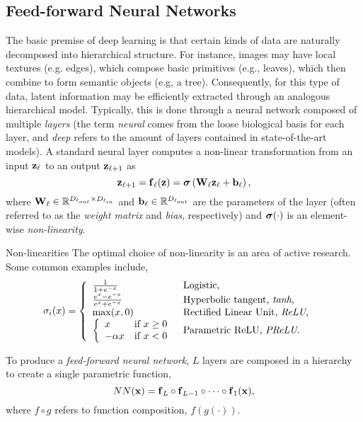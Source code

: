 \subsection{Feed-forward Neural Networks} 
The basic premise of deep learning is that certain kinds of data are naturally decomposed into hierarchical structure. For instance, images may have local textures (e.g. edges), which compose basic primitives (e.g., leaves), which then combine to form semantic objects (e.g, a tree). Consequently, for this type of data, latent information may be efficiently extracted through an analogous hierarchical model.  Typically, this is done through a neural network composed of multiple \textit{layers} (the term \textit{neural} comes from the loose biological basis for each layer, and \textit{deep} refers to the amount of layers contained in state-of-the-art models). A standard neural layer computes a non-linear transformation from an input $\boldsymbol{\mathbf{z}}_\ell$ to an output $\boldsymbol{\mathbf{z}}_{\ell+1}$ as  
\begin{equation}
\boldsymbol{\mathbf{z}}_{\ell+1} = \boldsymbol{\mathbf{f}}_\ell(\boldsymbol{\mathbf{z}}) = \boldsymbol{\mathbf{\sigma}}\left(\boldsymbol{\mathbf{W}}_\ell\boldsymbol{\mathbf{z}}_\ell + \boldsymbol{\mathbf{b}}_\ell\right),
\end{equation}
where $\boldsymbol{\mathbf{W}}_\ell \in \mathbb{R}^{D_{\ell_{out}} \times D_{\ell_{in}}}$ and $\boldsymbol{\mathbf{b}}_\ell \in \mathbb{R}^{D_{\ell_{out}}}$ are the parameters of the layer (often referred to as the \textit{weight matrix} and \textit{bias}, respectively) and $\boldsymbol{\mathbf{\sigma}}(\cdot)$ is an element-wise \textit{non-linearity}.

\begin{remark}{Non-linearities}
	The optimal choice of non-linearity is an area of active research. Some common examples include,
	\begin{align}
\sigma_i(x) &= \left\{  	\begin{array}{ll}
		 \frac{1}{1+e^{-x}}   & \mbox{Logistic,} \\
		 \frac{e^x - e^{-x}}{e^x + e^{-x}}  & \mbox{Hyperbolic tangent, \textit{tanh},} \\
		 \max(x, 0)  & \mbox{Rectified Linear Unit, \textit{ReLU},} \\
		\left\{  	\begin{array}{ll}  x & \mbox{if} ~x \geq 0 \\
										-\alpha x & \mbox{if} ~ x < 0 \end{array}
		\right.   & \mbox{Parametric ReLU, \textit{PReLU}.} \end{array}\right.
\end{align}
\end{remark}
To produce a \textit{feed-forward neural network}, $L$ layers are composed in a hierarchy to create a single parametric function,
\begin{equation}
 NN(\boldsymbol{\mathbf{x}}) = \boldsymbol{\mathbf{f}}_L \circ \boldsymbol{\mathbf{f}}_{L-1} \circ \cdots \circ \boldsymbol{\mathbf{f}}_{1}(\boldsymbol{\mathbf{x}}),
\end{equation}
where $f \circ g$ refers to function composition, $f (g(\cdot))$.


